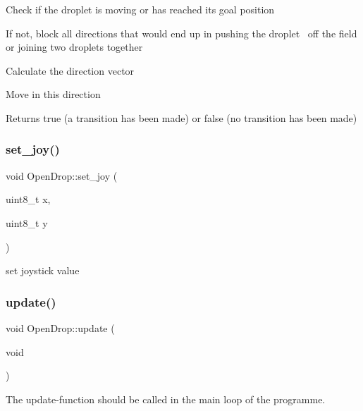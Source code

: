\begin{DoxyEnumerate}
\item Check if the droplet is moving or has reached its goal position~\newline

\item If not, block all directions that would end up in pushing the droplet~\newline
off the field or joining two droplets together
\item Calculate the direction vector~\newline

\item Move in this direction \begin{DoxyReturn}{Returns}
true (a transition has been made) or false (no transition has been made) 
\end{DoxyReturn}

\end{DoxyEnumerate}\mbox{\label{class_open_drop_a22b59d59e85c2e36fee67cd38c11ec69}} 
\subsubsection{\texorpdfstring{set\+\_\+joy()}{set\_joy()}}
{\footnotesize\ttfamily void Open\+Drop\+::set\+\_\+joy (\begin{DoxyParamCaption}\item[{uint8\+\_\+t}]{x,  }\item[{uint8\+\_\+t}]{y }\end{DoxyParamCaption})}

set joystick value \mbox{\label{class_open_drop_a7861cb91ff543065b3cac3e5698eb1f4}} 
\subsubsection{\texorpdfstring{update()}{update()}}
{\footnotesize\ttfamily void Open\+Drop\+::update (\begin{DoxyParamCaption}\item[{void}]{ }\end{DoxyParamCaption})}

The update-\/function should be called in the main loop of the programme.~\newline


